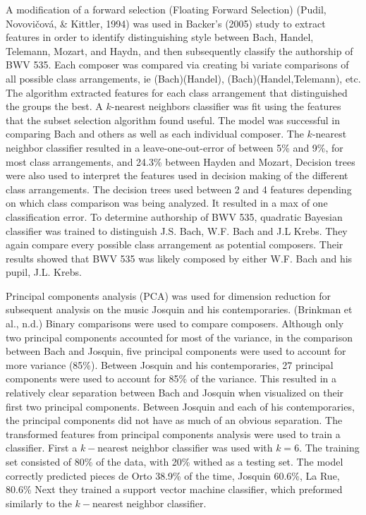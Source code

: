 \documentclass[12pt,twoside]{reedthesis}
\theoremstyle{definition}
\theoremstyle{definition}
\theoremstyle{definition}
\theoremstyle{remark}
\begin{document}
A modification of a forward selection (Floating Forward Selection)
(Pudil, Novovičová, \& Kittler, 1994) was used in Backer's (2005) study
to extract features in order to identify distinguishing style between
Bach, Handel, Telemann, Mozart, and Haydn, and then subsequently
classify the authorship of BWV 535. Each composer was compared via
creating bi variate comparisons of all possible class arrangements, ie
(Bach)(Handel), (Bach)(Handel,Telemann), etc. The algorithm extracted
features for each class arrangement that distinguished the groups the
best. A \(k\)-nearest neighbors classifier was fit using the features
that the subset selection algorithm found useful. The model was
successful in comparing Bach and others as well as each individual
composer. The \(k\)-nearest neighbor classifier resulted in a
leave-one-out-error of between 5\% and 9\%, for most class arrangements,
and 24.3\% between Hayden and Mozart, Decision trees were also used to
interpret the features used in decision making of the different class
arrangements. The decision trees used between 2 and 4 features depending
on which class comparison was being analyzed. It resulted in a max of
one classification error. To determine authorship of BWV 535, quadratic
Bayesian classifier was trained to distinguish J.S. Bach, W.F. Bach and
J.L Krebs. They again compare every possible class arrangement as
potential composers. Their results showed that BWV 535 was likely
composed by either W.F. Bach and his pupil, J.L. Krebs.

Principal components analysis (PCA) was used for dimension reduction for
subsequent analysis on the music Josquin and his contemporaries.
(Brinkman et al., n.d.) Binary comparisons were used to compare
composers. Although only two principal components accounted for most of
the variance, in the comparison between Bach and Josquin, five principal
components were used to account for more variance (85\%). Between
Josquin and his contemporaries, 27 principal components were used to
account for 85\% of the variance. This resulted in a relatively clear
separation between Bach and Josquin when visualized on their first two
principal components. Between Josquin and each of his contemporaries,
the principal components did not have as much of an obvious separation.
The transformed features from principal components analysis were used to
train a classifier. First a \(k-\)nearest neighbor classifier was used
with \(k = 6\). The training set consisted of 80\% of the data, with
20\% withed as a testing set. The model correctly predicted pieces de
Orto 38.9\% of the time, Josquin 60.6\%, La Rue, 80.6\% Next they
trained a support vector machine classifier, which preformed similarly
to the \(k-\)nearest neighbor classifier.
\end{document}
